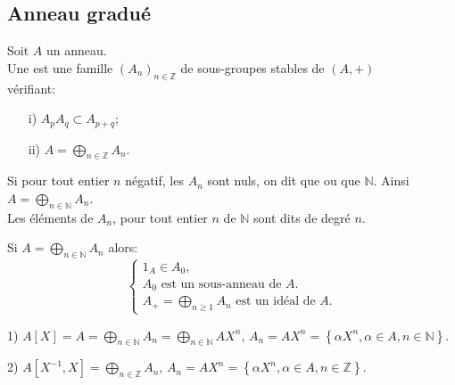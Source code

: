 \subsection{Anneau gradué}
\begin{madefinition}
	Soit $A$ un anneau.\\
	Une  est une famille $(A_n)_{n \in \mathbb{Z}}$ de  sous-groupes stables de $(A,+)$ \\vérifiant:
	\begin{enumerate}
		\item[i)] $ A_p A_q \subset A_{p+q} $;
		\item[ii)] $ A =\displaystyle \bigoplus_{n \in \mathbb{Z}}{A_n} $.
	\end{enumerate}
	Si pour tout  entier $n$ négatif, les $A_n$ sont nuls, on dit que  ou que  $\mathbb{N}$. Ainsi $ A =\displaystyle \bigoplus_{n \in \mathbb{N}}{A_n} $.\\ Les éléments de $A_n$, pour tout entier $n$ de $ \mathbb{N} $ sont dits de degré $n$.
\end{madefinition} 
\begin{maremarque}
	Si $ A =\displaystyle \bigoplus_{n \in \mathbb{N}}{A_n} $ alors:
	$$  
	\begin{cases}
		1_A \in A_0,\\
		A_0 \text{ est un sous-anneau de }A. \\
		 A_{+} =\displaystyle \bigoplus_{n \geqslant 1}{A_n} \text{ est un idéal de }A.
	\end{cases}
	$$
	\begin{monexemple}
		\item[1)] $A[X] =  A =\displaystyle \bigoplus_{n \in \mathbb{N}}{A_n} =\displaystyle \bigoplus_{n \in \mathbb{N}}{A}X^n $, $A_n=AX^n = \left\{\alpha X^n, \alpha \in A, n \in \mathbb{N} \right\}$.
		\item[2)] $ A[X^{-1}, X] = \displaystyle \bigoplus_{n \in \mathbb{Z}}{A_n}$, $A_n=AX^n=\left\{\alpha X^n, \alpha \in A, n \in \mathbb{Z} \right\}$.
	\end{monexemple}
\end{maremarque}
